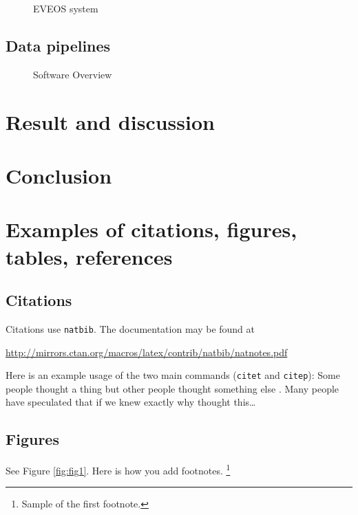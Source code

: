 \documentclass{article}
\begin{document}
\begin{figure}[ht]
  \centering
  \def\svgwidth{\columnwidth}
  
  \caption{\label{fig:veos} EVEOS system}
\end{figure}


\subsection{Data pipelines}

\begin{figure}[ht]
  \centering
  \def\svgwidth{\columnwidth}
  
  \caption{\label{fig:label} Software Overview}
\end{figure}


\section{Result and discussion}
\label{sec:result}


\section{Conclusion}
\label{sec:conclusion}




\section{Examples of citations, figures, tables, references}
\label{sec:others}

\subsection{Citations}
Citations use \verb+natbib+. The documentation may be found at
\begin{center}
	\url{http://mirrors.ctan.org/macros/latex/contrib/natbib/natnotes.pdf}
\end{center}

Here is an example usage of the two main commands (\verb+citet+ and \verb+citep+): Some people thought a thing \citep{kour2014real, keshet2016prediction} but other people thought something else \citep{kour2014fast}. Many people have speculated that if we knew exactly why \citet{kour2014fast} thought this\dots

\subsection{Figures}
\lipsum[10]
See Figure \ref{fig:fig1}. Here is how you add footnotes. \footnote{Sample of the first footnote.}
\lipsum[11]
\end{document}
